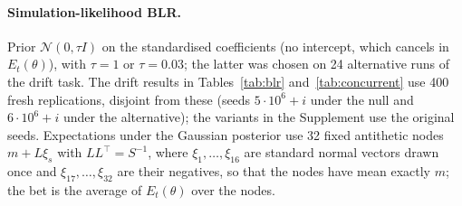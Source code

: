 \documentclass[pdflatex,sn-mathphys-ay]{sn-jnl}
\theoremstyle{thmstyleone}
\theoremstyle{thmstyletwo}
\begin{document}
\begin{appendices}
\paragraph{Simulation-likelihood BLR.} Prior $\mathcal N(0, \tau I)$ on the
standardised coefficients (no intercept, which cancels in $E_t(\theta)$), with
$\tau = 1$ or $\tau = 0.03$; the latter was chosen on 24 alternative runs of the
drift task. The drift results in Tables~\ref{tab:blr} and~\ref{tab:concurrent}
use 400 fresh replications, disjoint from these (seeds $5\cdot10^6+i$ under the
null and $6\cdot10^6+i$ under the alternative); the variants in the Supplement
use the original seeds. Expectations under the Gaussian
posterior use 32 fixed antithetic nodes $m + L\xi_s$ with $LL^\top = S^{-1}$,
where $\xi_1, \ldots, \xi_{16}$ are standard normal vectors drawn once and
$\xi_{17}, \ldots, \xi_{32}$ are their negatives, so that the nodes have mean
exactly $m$; the bet is the average of $E_t(\theta)$ over the nodes.


\end{appendices}
\end{document}
